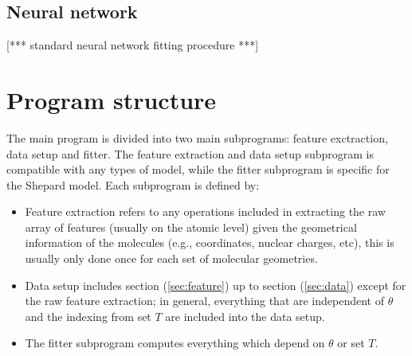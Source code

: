 \documentclass[12pt]{article}
\def\att{                    %
        \marginpar[ \hspace*{\fill} \raisebox{-0.2em}{\rule{2mm}{1.2em}} ]
        {\raisebox{-0.2em}{\rule{2mm}{1.2em}} }
        }
\def\at#1{[*** \att #1 ***]}  %
\begin{document}
\subsection{Neural network}
\at{standard neural network fitting procedure}


\section{Program structure}
The main program is divided into two main subprograms: feature exctraction, data setup and fitter. The feature extraction and data setup subprogram is compatible with any types of model, while the fitter subprogram is specific for the Shepard model. Each subprogram is defined by:
\begin{itemize}
	\item Feature extraction refers to any operations included in extracting the raw array of features (usually on the atomic level) given the geometrical information of the molecules (e.g., coordinates, nuclear charges, etc), this is usually only done once for each set of molecular geometries.
	\item Data setup includes section (\ref{sec:feature}) up to section (\ref{sec:data}) except for the raw feature extraction; in general, everything that are independent of $\theta$ and the indexing from set $T$ are included into the data setup. 
	\item The fitter subprogram computes everything which depend on $\theta$ or set $T$. 
\end{itemize}

 
\end{document}
